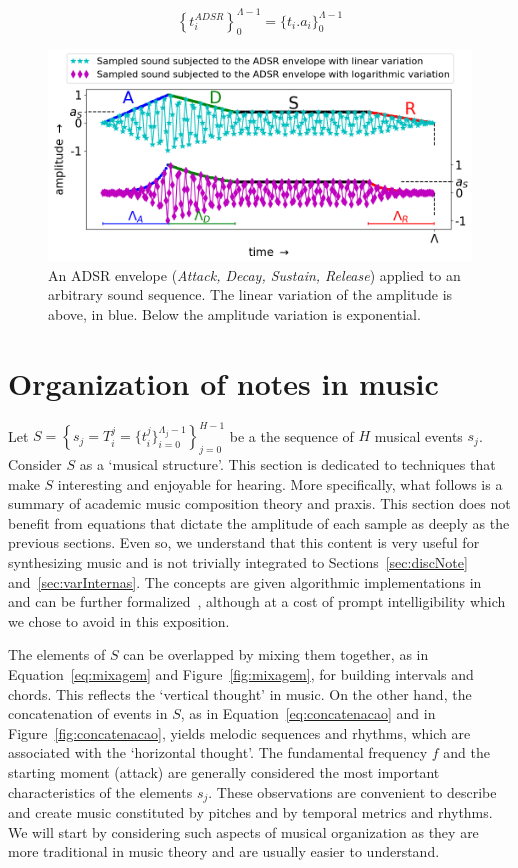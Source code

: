 \begin{equation}\label{eq:adsrApl}
\left\{t_i^{ADSR}\right\}_0^{\Lambda-1} =\{t_i . a_i\}_0^{\Lambda-1}
\end{equation}

\begin{figure}[htp!]
    \centering
        \includegraphics[width=\columnwidth]{figures/adsr_}
    \caption{An ADSR envelope (\emph{Attack, Decay, Sustain, Release}) applied to an arbitrary sound sequence. The linear variation of the amplitude is above, in blue. Below the amplitude variation is exponential.}
        \label{fig:adsr}
\end{figure}

\section{Organization of notes in music}\label{notasMusica} \label{sec:notesMusic}
Let $S=\left\{  s_j=T_i^j=\{t_i^j\}_{i=0}^{\Lambda_j-1} \right\}_{j=0}^{H-1}$ be a the sequence of $H$ musical events $s_j$.
Consider $S$ as a `musical structure'.
This section is dedicated to techniques that make $S$ interesting and enjoyable for hearing.
More specifically, what follows is a summary of academic music composition theory and praxis.
This section does not benefit from equations that dictate the amplitude of each sample as deeply as the previous sections.
Even so, we understand that this content is very useful for synthesizing music and is not trivially integrated to Sections~\ref{sec:discNote}
and~\ref{sec:varInternas}.
The concepts are given algorithmic implementations in \mass~\cite{massListings} and can be further formalized~\cite{topos},
although at a cost of prompt intelligibility which we chose to avoid in this exposition.

The elements of $S$ can be overlapped by mixing them together, as in
Equation~\ref{eq:mixagem} and Figure~\ref{fig:mixagem}, for building intervals and chords. This reflects the `vertical thought' in music. On the other hand, the concatenation of events
in $S$, as in Equation~\ref{eq:concatenacao} and in Figure~\ref{fig:concatenacao},
yields melodic sequences and rhythms, which are associated with the `horizontal thought'.
The fundamental frequency $f$ and the starting moment
(attack) are generally considered the most important characteristics of the elements $s_j$.
These observations are convenient to describe and create music constituted by pitches and by temporal metrics and rhythms.
We will start by considering such aspects of musical organization as they are more
traditional in music theory and are usually easier to understand.

